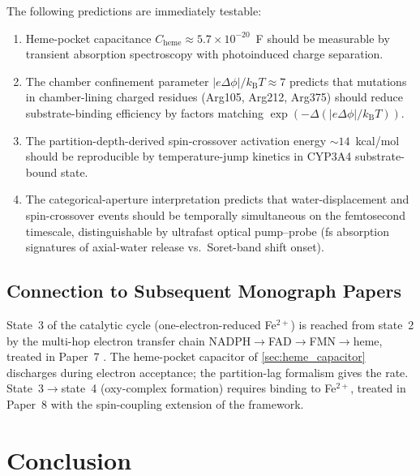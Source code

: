 \documentclass[11pt,twocolumn,a4paper]{article}
\theoremstyle{definition}
\theoremstyle{remark}
\newcommand{\kB}{k_{\mathrm{B}}}
\begin{document}
The following predictions are immediately testable:

\begin{enumerate}[nosep, leftmargin=*]
\item Heme-pocket capacitance $C_{\mathrm{heme}} \approx 5.7 \times 10^{-20}$~F should be measurable by transient absorption spectroscopy with photoinduced charge separation.
\item The chamber confinement parameter $|e\Delta\phi|/\kB T \approx 7$ predicts that mutations in chamber-lining charged residues (Arg105, Arg212, Arg375) should reduce substrate-binding efficiency by factors matching $\exp(-\Delta(|e\Delta\phi|/\kB T))$.
\item The partition-depth-derived spin-crossover activation energy $\sim 14$~kcal/mol should be reproducible by temperature-jump kinetics in CYP3A4 substrate-bound state.
\item The categorical-aperture interpretation predicts that water-displacement and spin-crossover events should be temporally simultaneous on the femtosecond timescale, distinguishable by ultrafast optical pump--probe (fs absorption signatures of axial-water release vs.\ Soret-band shift onset).
\end{enumerate}

\subsection{Connection to Subsequent Monograph Papers}

State~3 of the catalytic cycle (one-electron-reduced Fe$^{2+}$) is reached from state~2 by the multi-hop electron transfer chain NADPH$\to$FAD$\to$FMN$\to$heme, treated in Paper~7 \citep{sachikonye2025_paper7_planned}. The heme-pocket capacitor of \cref{sec:heme_capacitor} discharges during electron acceptance; the partition-lag formalism gives the rate. State~3$\to$state~4 (oxy-complex formation) requires  binding to Fe$^{2+}$, treated in Paper~8 with the spin-coupling extension of the framework.

\section{Conclusion}
\label{sec:conclusion}
\end{document}
